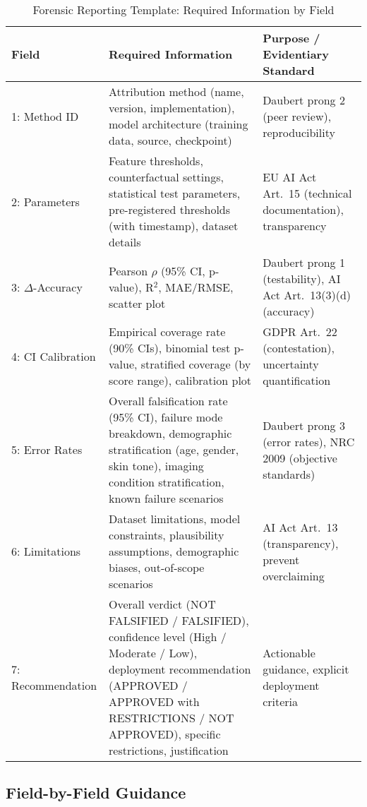 \begin{table*}[!t]
\centering
\caption{Forensic Reporting Template: Required Information by Field}
\label{tab:template_fields}
\small
\begin{tabular}{@{}p{}p{}p{}@{}}
\toprule
\textbf{Field} & \textbf{Required Information} & \textbf{Purpose / Evidentiary Standard} \\ \midrule
1: Method ID & Attribution method (name, version, implementation), model architecture (training data, source, checkpoint) & Daubert prong 2 (peer review), reproducibility \\ \midrule
2: Parameters & Feature thresholds, counterfactual settings, statistical test parameters, pre-registered thresholds (with timestamp), dataset details & EU AI Act Art.~15 (technical documentation), transparency \\ \midrule
3: $\Delta$-Accuracy & Pearson $\rho$ (95\% CI, p-value), R$^2$, MAE/RMSE, scatter plot & Daubert prong 1 (testability), AI Act Art.~13(3)(d) (accuracy) \\ \midrule
4: CI Calibration & Empirical coverage rate (90\% CIs), binomial test p-value, stratified coverage (by score range), calibration plot & GDPR Art.~22 (contestation), uncertainty quantification \\ \midrule
5: Error Rates & Overall falsification rate (95\% CI), failure mode breakdown, demographic stratification (age, gender, skin tone), imaging condition stratification, known failure scenarios & Daubert prong 3 (error rates), NRC 2009 (objective standards) \\ \midrule
6: Limitations & Dataset limitations, model constraints, plausibility assumptions, demographic biases, out-of-scope scenarios & AI Act Art.~13 (transparency), prevent overclaiming \\ \midrule
7: Recommendation & Overall verdict (NOT FALSIFIED / FALSIFIED), confidence level (High / Moderate / Low), deployment recommendation (APPROVED / APPROVED with RESTRICTIONS / NOT APPROVED), specific restrictions, justification & Actionable guidance, explicit deployment criteria \\ \bottomrule
\end{tabular}
\end{table*}

\subsection{Field-by-Field Guidance}

